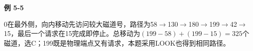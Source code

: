 {\color{ink}\bfseries 例 5-5}\par\vspace{1bp}0在最外侧，向内移动先访问较大磁道号，路径为58\(\to \)130\(\to \)180\(\to \)199\(\to \)42\(\to \)15，最后一个请求在15完成即停止。总移动为\((199-58)+\allowbreak{}(199-15)=\allowbreak{}325\)个磁道，选C；199既是物理端点又有请求，本题采用LOOK也得到相同路径。
